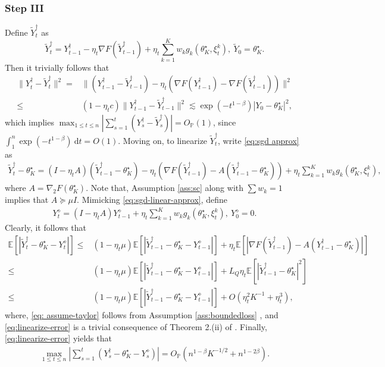 \documentclass[a4paper,11pt]{article}
\numberwithin{equation}{section}
\theoremstyle{plain}
\theoremstyle{remark}
\def\IE{\mathbb{E}}
\newcommand{\minparam}{\theta^\star_K}
\newcommand{\IP}{\mathbb{P}}
\begin{document}
\subsubsection{Step III}
 Define $\tilde{Y}_t^\dagger$ as
\[ \tilde{Y}_t^\dagger = Y_{t-1}^\dagger -  \eta_t \nabla F(\tilde{Y}_{t-1}^\dagger) +\eta_t \sum_{k=1}^K w_k g_k (\minparam, \xi_t^k), \ \tilde{Y}_0=\minparam.  \]
Then it trivially follows that 
\begin{align}
    \|Y_t^\dagger- \tilde{Y}_t^\dagger\|^2 =&\|(Y_{t-1}^\dagger -  \tilde{Y}_{t-1}^\dagger) - \eta_t(\nabla F(Y_{t-1}^\dagger) - \nabla F(\tilde{Y}_{t-1}^\dagger))\|^2\nonumber\\
    \leq & (1-\eta_tc)\|Y_{t-1}^\dagger- \tilde{Y}_{t-1}^\dagger \|^2  \lesssim \exp(-t^{1-\beta}) |Y_0 - \minparam|^2,
\end{align}
which implies $\max_{1\leq t\leq n}|\sum_{s=1}^t(Y_s^\dagger - \tilde{Y}_s^\dagger)| = O_{\IP}(1)$, since $\int_1^n \exp(-t^{1-\beta}) \ \text{d}t=O(1)$. Moving on, to linearize $\tilde{Y}_t^\dagger$, write \eqref{eq:sgd approx} as
\begin{align}
    \tilde{Y}_t^\dagger-\minparam=(I-\eta_t A)(\tilde{Y}_{t-1}^\dagger -\minparam)- \eta_t (\nabla F(\tilde{Y}_{t-1}^\dagger) - A (\tilde{Y}_{t-1}^\dagger-\minparam))+\eta_t \sum_{k=1}^K w_k g_k (\minparam, \xi_t^k), \label{eq:sgd-linear-approx}
\end{align}
where $A=\nabla_2 F(\minparam)$. Note that, Assumption \ref{ass:sc} along with $\sum w_k=1$ implies that $A\succeq \mu I$. 
Mimicking \eqref{eq:sgd-linear-approx}, define
\begin{align}
    Y_t^\diamond = (I-\eta_t A)Y_{t-1}^\diamond + \eta_t \sum_{k=1}^K w_k g_k (\minparam, \xi_t^k), \ Y_0^\diamond=0. \label{eq:linear-approx}
\end{align}
Clearly, it follows that
\begin{align}
    \IE[|\tilde{Y}_t^\dagger - \minparam - Y_t^\diamond|] \leq& (1-\eta_t\mu)\IE[|\tilde{Y}_{t-1}^\dagger - \minparam - Y_{t-1}^\diamond|]+ \eta_t \IE[|\nabla F(\tilde{Y}_{t-1}^\dagger) - A (Y_{t-1}^\dagger - \minparam)|] \nonumber\\
    \leq & (1-\eta_t\mu)\IE[|\tilde{Y}_{t-1}^\dagger - \minparam - Y_{t-1}^\diamond|] + L_Q\eta_t \IE[|\tilde{Y}_{t-1}^\dagger - \minparam|^2] \label{eq: assume-taylor}\\
    \leq & (1-\eta_t\mu)\IE[|\tilde{Y}_{t-1}^\dagger - \minparam - Y_{t-1}^\diamond|] + O(\eta_t^2 K^{-1}+ \eta_t^3), \label{eq:linearize-error}
\end{align}
where, \eqref{eq: assume-taylor} follows from Assumption \ref{ass:boundedloss} , and \eqref{eq:linearize-error} is a trivial consequence of Theorem 2.(ii) of \cite{songxichen2024}. Finally, \eqref{eq:linearize-error} yields that
\begin{align} \label{eq:kmt-step-3}
    \max_{1\leq t \leq n} |\sum_{s=1}^t(Y_s^\dagger - \minparam - Y_s^\diamond)|= O_{\IP}(n^{1-\beta}K^{-1/2} +  n^{1-2\beta}).
\end{align}
\end{document}
